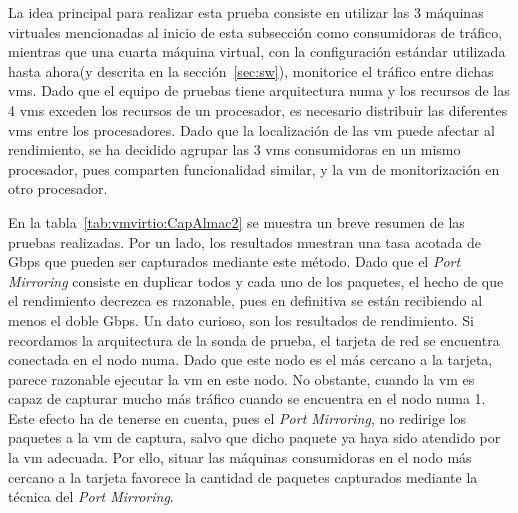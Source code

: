 La idea principal para realizar esta prueba consiste en utilizar las 3 máquinas virtuales mencionadas al inicio de esta subsección como consumidoras de tráfico, mientras que una cuarta máquina virtual, con la configuración estándar utilizada hasta ahora(y descrita en la sección~\ref{sec:sw}), monitorice el tráfico entre dichas \glspl{vm}.
Dado que el equipo de pruebas tiene arquitectura \gls{numa} y los recursos de las 4 \glspl{vm} exceden los recursos de un procesador, es necesario distribuir las diferentes \glspl{vm} entre los procesadores. Dado que la localización de las \gls{vm} puede afectar al rendimiento, se ha decidido agrupar las 3 \glspl{vm} consumidoras en un mismo procesador, pues comparten funcionalidad similar, y la \gls{vm} de monitorización en otro procesador. 

En la tabla~\ref{tab:vmvirtio:CapAlmac2} se muestra un breve resumen de las pruebas realizadas. Por un lado, los resultados muestran una tasa acotada de Gbps que pueden ser capturados mediante este método. Dado que el \textit{Port Mirroring} consiste en duplicar todos y cada uno de los paquetes, el hecho de que el rendimiento decrezca es razonable, pues en definitiva se están recibiendo al menos el doble Gbps.
Un dato curioso, son los resultados de rendimiento. Si recordamos la arquitectura de la sonda de prueba, el tarjeta de red se encuentra conectada en el nodo \gls{numa}. Dado que este nodo es el más cercano a la tarjeta, parece razonable ejecutar la \gls{vm} en este nodo. No obstante, cuando la \gls{vm} es capaz de capturar mucho más tráfico cuando se encuentra en el nodo \gls{numa} 1.
Este efecto ha de tenerse en cuenta, pues el \textit{Port Mirroring}, no redirige los paquetes a la \gls{vm} de captura, salvo que dicho paquete ya haya sido atendido por la \gls{vm} adecuada. Por ello, situar las máquinas consumidoras en el nodo más cercano a la tarjeta favorece la cantidad de paquetes capturados mediante la técnica del \textit{Port Mirroring}.

